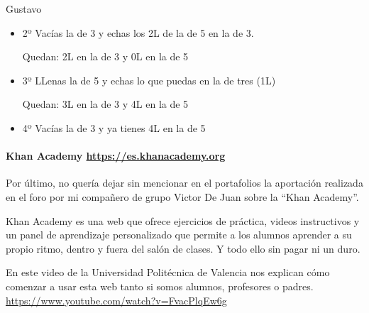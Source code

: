 \begin{opin}{\guscolor}{Gustavo}
\begin{itemize}
Quedan 3L en la de 3 y 2L en la de 5

\item 2º Vacías la de 3 y echas los 2L de la de 5 en la de 3.  

Quedan: 2L en la de 3 y 0L en la de 5

\item 3º LLenas la de 5 y echas lo que puedas en la de tres (1L)  

Quedan: 3L en la de 3 y 4L en la de 5

\item 4º Vacías la de 3 y ya tienes 4L en la de 5 
\end{itemize}

\paragraph{Khan Academy \url{https://es.khanacademy.org}}
Por último, no quería dejar sin mencionar en el portafolios la aportación realizada en el foro  por mi compañero de grupo Victor De Juan sobre la “Khan Academy”.

Khan Academy es una web que ofrece ejercicios de práctica, videos instructivos y un panel de aprendizaje personalizado que permite a los alumnos aprender a su propio ritmo, dentro y fuera del salón de clases. Y todo ello sin pagar ni un duro.

En este video de la Universidad Politécnica de Valencia nos explican cómo comenzar a usar esta web tanto si somos alumnos, profesores o padres. \url{https://www.youtube.com/watch?v=FvacPlqEw6g}

 


\end{opin}

